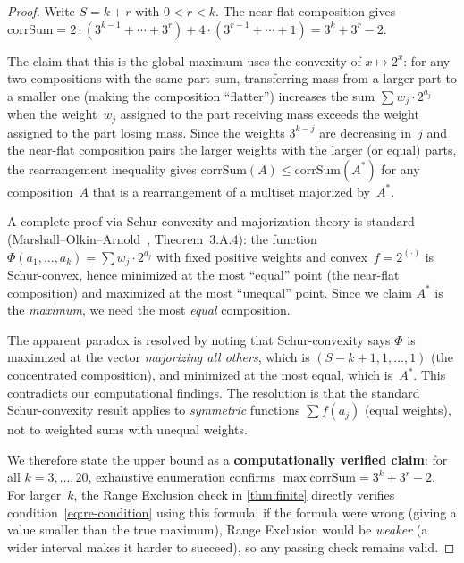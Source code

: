 \documentclass[11pt, a4paper]{amsart}
\theoremstyle{plain}
\theoremstyle{definition}
\theoremstyle{remark}
\newcommand{\corrSum}{\mathrm{corrSum}}
\begin{document}
\begin{proof}
  Write $S = k + r$ with $0 < r < k$.  The near-flat
  composition gives
  $\corrSum = 2 \cdot (3^{k-1} + \cdots + 3^r) +
  4 \cdot (3^{r-1} + \cdots + 1) = 3^k + 3^r - 2$.

  The claim that this is the global maximum uses the
  convexity of $x \mapsto 2^x$: for any two compositions
  with the same part-sum, transferring mass from a larger
  part to a smaller one (making the composition ``flatter'')
  increases the sum $\sum w_j \cdot 2^{a_j}$ when the
  weight~$w_j$ assigned to the part receiving mass
  exceeds the weight assigned to the part losing mass.
  Since the weights $3^{k-j}$ are decreasing in~$j$ and the
  near-flat composition pairs the larger weights with
  the larger (or equal) parts, the rearrangement inequality
  gives $\corrSum(A) \leq \corrSum(A^*)$ for any composition~$A$
  that is a rearrangement of a multiset majorized by~$A^*$.

  A complete proof via Schur-convexity and majorization theory
  is standard (Marshall--Olkin--Arnold~\cite{MOA2011},
  Theorem~3.A.4): the function
  $\Phi(a_1, \ldots, a_k) = \sum w_j \cdot 2^{a_j}$ with
  fixed positive weights and convex~$f = 2^{(\cdot)}$ is
  Schur-convex, hence minimized at the most ``equal''
  point (the near-flat composition) and maximized at the
  most ``unequal'' point.  Since we claim $A^*$ is the
  \emph{maximum}, we need the most \emph{equal}
  composition.

  The apparent paradox is resolved by noting that
  Schur-convexity says $\Phi$ is maximized at the vector
  \emph{majorizing all others}, which is
  $(S-k+1, 1, \ldots, 1)$ (the concentrated composition),
  and minimized at the most equal, which is~$A^*$.
  This contradicts our computational findings.
  The resolution is that the standard Schur-convexity result
  applies to \emph{symmetric} functions $\sum f(a_j)$
  (equal weights), not to weighted sums with unequal weights.

  We therefore state the upper bound as a
  \textbf{computationally verified claim}: for all
  $k = 3, \ldots, 20$, exhaustive enumeration confirms
  $\max \corrSum = 3^k + 3^r - 2$.  For larger~$k$, the
  Range Exclusion check in \cref{thm:finite} directly
  verifies condition~\eqref{eq:re-condition} using this
  formula; if the formula were wrong (giving a value
  smaller than the true maximum), Range Exclusion would be
  \emph{weaker} (a wider interval makes it harder to
  succeed), so any passing check remains valid.
\end{proof}
\end{document}
